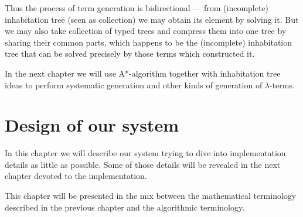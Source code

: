 \documentclass[12pt,a4paper]{report}
\newcommand{\lterms}{$\lambda$-terms\xspace}
\newenvironment{todo}
{ ~\\[0.5em]
  {\color{red}\textbf{TODO}}
  \begin{easylist}[itemize]}
{ \end{easylist}
  ~}
\begin{document}
\begin{enumerate}
      Thus the process of term generation is bidirectional ---
      from (incomplete) inhabitation tree (seen as collection) 
      we may obtain its element by solving it. But we may also 
      take collection of typed trees and compress them
      into one tree by sharing their common parts, which
      happens to be the (incomplete) inhabitation tree 
      that can be solved precisely by those terms which 
      constructed it.   
             
\end{enumerate}

In the next chapter we will use A*-algorithm together with
inhabitation tree ideas to perform systematic generation and other
kinds of generation of \lterms.

%


		

\chapter{ Design of our system }	

In this chapter we will describe our system trying to 
dive into implementation details as little as possible.
Some of those details will be revealed in the next chapter
devoted to the implementation. 

This chapter will be
presented in the mix between the mathematical terminology 
described in the previous chapter and the algorithmic terminology.\\
\end{document}
